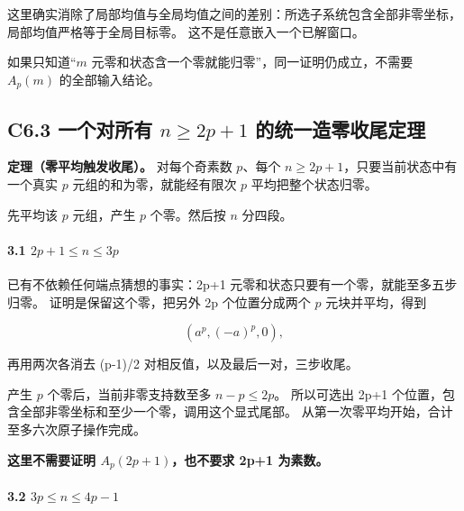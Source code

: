 \documentclass[11pt,a4paper]{article}
\theoremstyle{definition}
\numberwithin{equation}{section}
\begin{document}
{这里确实消除了局部均值与全局均值之间的差别：所选子系统包含全部非零坐标，局部均值严格等于全局目标零。} {这不是任意嵌入一个已解窗口。}

{如果只知道``\ensuremath{m}} {元零和状态含一个零就能归零''，同一证明仍成立，不需要} {\ensuremath{A_{p}(m)}} {的全部输入结论。}

\subsection*{\texorpdfstring{{C6.3} {一个对所有} {\ensuremath{n\ge 2p+1}} {的统一造零收尾定理}}{C6.3 一个对所有  的统一造零收尾定理}}\label{C6-h35}

\textbf{{定理（零平均触发收尾）。}} {对每个奇素数} {\ensuremath{p}、每个} {\ensuremath{n\ge 2p+1}，只要当前状态中有一个真实} {\ensuremath{p}} {元组的和为零，就能经有限次} {\ensuremath{p}} {平均把整个状态归零。}

{先平均该} {\ensuremath{p}} {元组，产生} {\ensuremath{p}} {个零。然后按} {\ensuremath{n}} {分四段。}

\paragraph*{\texorpdfstring{{3.1} {\ensuremath{2p+1\le n\le 3p}}}{3.1 }}\label{C6-h36}

{已有不依赖任何端点猜想的事实：2p+1} {元零和状态只要有一个零，就能至多五步归零。} {证明是保留这个零，把另外} {2p} {个位置分成两个} {\ensuremath{p}} {元块并平均，得到}

\[
(a^p,(-a)^p,0),
\]

{再用两次各消去} {(p-1)/2} {对相反值，以及最后一对，三步收尾。}

{产生} {\ensuremath{p}} {个零后，当前非零支持数至多} {\ensuremath{n-p\le 2p}。} {所以可选出} {2p+1} {个位置，包含全部非零坐标和至少一个零，调用这个显式尾部。} {从第一次零平均开始，合计至多六次原子操作完成。}

\textbf{{这里不需要证明} {\ensuremath{A_{p}(2p+1)}，也不要求} {2p+1} {为素数。}}

\paragraph*{\texorpdfstring{{3.2} {\ensuremath{3p\le n\le 4p-1}}}{3.2 }}\label{C6-h37}
\end{document}

